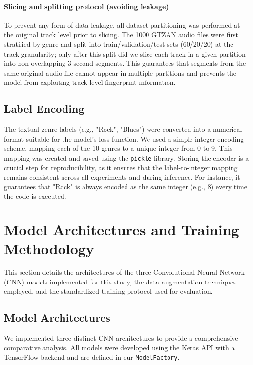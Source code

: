 \documentclass[11pt,a4paper]{article}
\begin{document}
\paragraph{Slicing and splitting protocol (avoiding leakage)}
To prevent any form of data leakage, all dataset partitioning was performed at the original track level prior to slicing. The 1000 GTZAN audio files were first stratified by genre and split into train/validation/test sets (60/20/20) at the track granularity; only after this split did we slice each track in a given partition into non-overlapping 3-second segments. This guarantees that segments from the same original audio file cannot appear in multiple partitions and prevents the model from exploiting track-level fingerprint information.

\subsection{Label Encoding}
The textual genre labels (e.g., "Rock", "Blues") were converted into a numerical format suitable for the model's loss function. We used a simple integer encoding scheme, mapping each of the 10 genres to a unique integer from 0 to 9. This mapping was created and saved using the \texttt{pickle} library. Storing the encoder is a crucial step for reproducibility, as it ensures that the label-to-integer mapping remains consistent across all experiments and during inference. For instance, it guarantees that "Rock" is always encoded as the same integer (e.g., 8) every time the code is executed.

\section{Model Architectures and Training Methodology}
\label{sec:methodology}
This section details the architectures of the three Convolutional Neural Network (CNN) models implemented for this study, the data augmentation techniques employed, and the standardized training protocol used for evaluation.

\subsection{Model Architectures}
We implemented three distinct CNN architectures to provide a comprehensive comparative analysis. All models were developed using the Keras API with a TensorFlow backend and are defined in our \texttt{ModelFactory}.
\end{document}
